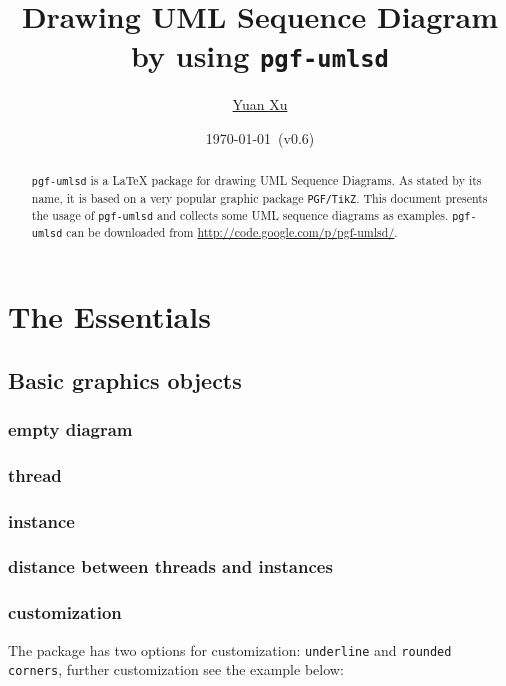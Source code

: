 \documentclass{article}
\newcommand{\demo}[2][1]{
\begin{minipage}{.49\linewidth}
\centering
\resizebox{#1\linewidth}{!}{

}
\end{minipage}
\hspace{0.01\linewidth}
\begin{minipage}{.5\linewidth}

\end{minipage}
}
\begin{document}
\title{Drawing UML Sequence Diagram by using \texttt{pgf-umlsd}}
\author{\href{mailto:xuyuan.cn@gmail.com}{Yuan Xu}}
\date{\today{}~(v0.6)}
\maketitle

\begin{abstract}
  \texttt{pgf-umlsd} is a LaTeX package for drawing UML Sequence
  Diagrams. As stated by its name, it is based on a very popular
  graphic package \texttt{PGF/TikZ}. This document presents the usage
  of \texttt{pgf-umlsd} and collects some UML sequence diagrams as
  examples. \texttt{pgf-umlsd} can be downloaded from
  \href{http://code.google.com/p/pgf-umlsd/}{http://code.google.com/p/pgf-umlsd/}.
\end{abstract}

\tableofcontents

\section{The Essentials}
\subsection{Basic graphics objects}
\subsubsection{empty diagram}
\demo{empty}

\subsubsection{thread}
\demo[0.3]{thread}

\subsubsection{instance}
\demo[0.3]{instance}

\subsubsection{distance between threads and instances}
\demo{distance}

\subsubsection{customization}
The package has two options for customization: \texttt{underline} and
\texttt{rounded corners}, further customization see the example below:
\end{document}
